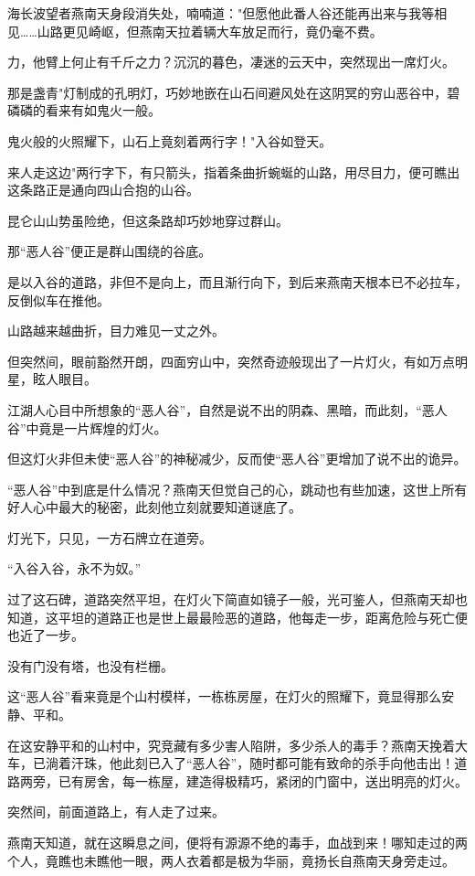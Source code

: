 \documentclass[12pt,oneside]{book}
\begin{document}
海长波望者燕南天身段消失处，喃喃道："但愿他此番人谷还能再出来与我等相见\ldots\ldots 山路更见崎岖，但燕南天拉着辆大车放足而行，竟仍毫不费。

力，他臂上何止有千斤之力？沉沉的暮色，凄迷的云天中，突然现出一席灯火。

那是盏青"灯制成的孔明灯，巧妙地嵌在山石间避风处在这阴冥的穷山恶谷中，碧磷磷的看来有如鬼火一般。

鬼火般的火照耀下，山石上竟刻着两行字！"入谷如登天。

来人走这边"两行字下，有只箭头，指着条曲折蜿蜒的山路，用尽目力，便可瞧出这条路正是通向四山合抱的山谷。

昆仑山山势虽险绝，但这条路却巧妙地穿过群山。

那``恶人谷''便正是群山围绕的谷底。

是以入谷的道路，非但不是向上，而且渐行向下，到后来燕南天根本已不必拉车，反倒似车在推他。

山路越来越曲折，目力难见一丈之外。

但突然间，眼前豁然开朗，四面穷山中，突然奇迹般现出了一片灯火，有如万点明星，眩人眼目。

江湖人心目中所想象的``恶人谷''，自然是说不出的阴森、黑暗，而此刻，``恶人谷''中竟是一片辉煌的灯火。

但这灯火非但未使``恶人谷''的神秘减少，反而使``恶人谷''更增加了说不出的诡异。

``恶人谷''中到底是什么情况？燕南天但觉自己的心，跳动也有些加速，这世上所有好人心中最大的秘密，此刻他立刻就要知道谜底了。

灯光下，只见，一方石牌立在道旁。

``入谷入谷，永不为奴。''

过了这石碑，道路突然平坦，在灯火下简直如镜子一般，光可鉴人，但燕南天却也知道，这平坦的道路正也是世上最最险恶的道路，他每走一步，距离危险与死亡便也近了一步。

没有门没有塔，也没有栏栅。

这``恶人谷''看来竟是个山村模样，一栋栋房屋，在灯火的照耀下，竟显得那么安静、平和。

在这安静平和的山村中，究竞藏有多少害人陷阱，多少杀人的毒手？燕南天挽着大车，已淌着汗珠，他此刻已入了``恶人谷''，随时都可能有致命的杀手向他击出！道路两旁，已有房舍，每一栋屋，建造得极精巧，紧闭的门窗中，送出明亮的灯火。

突然间，前面道路上，有人走了过来。

燕南天知道，就在这瞬息之间，便将有源源不绝的毒手，血战到来！哪知走过的两个人，竟瞧也未瞧他一眼，两人衣着都是极为华丽，竟扬长自燕南天身旁走过。
\end{document}
